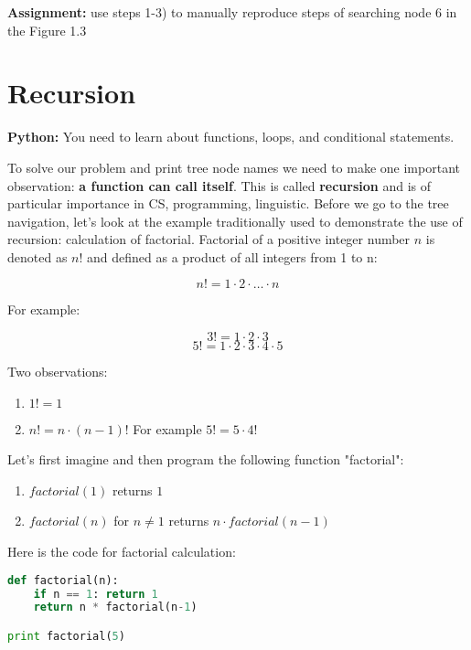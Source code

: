 \bigskip
\begin{tcolorbox}
\textbf{Assignment:} use steps 1-3) to manually reproduce 
steps of searching node 6 in
the Figure 1.3 
\end{tcolorbox}

\section{Recursion}

\begin{tcolorbox}
\textbf{Python:} 
You need to learn about functions, loops, and conditional statements.
\end{tcolorbox}

To solve our problem and print tree node names we need
to make one important observation: \textbf{a function can call itself}.
This is called \textbf{recursion} and is of particular importance in
CS, programming, linguistic. Before we go to the tree navigation,
let's look at the example traditionally used to demonstrate
the use of recursion: calculation of factorial. Factorial of a
positive integer number $n$
is denoted as $n!$ and defined as a product of all integers
from 1 to n:

$$n! = 1 \cdot 2 \cdot\dots\cdot n$$

For example:

$$3! = 1\cdot 2\cdot 3$$
$$5! = 1\cdot 2\cdot 3\cdot 4\cdot 5$$

Two observations:

\begin{leftborder}
\begin{enumerate}
\item $1! = 1$
\item $n! = n\cdot (n-1)!$ For example $5! = 5\cdot 4!$
\end{enumerate}
\end{leftborder}

Let's first imagine and then program the following function "factorial":

\begin{leftborder}
\begin{enumerate}
\item $factorial(1)$ returns $1$
\item $factorial(n)$ for $n\neq 1$ returns $n\cdot factorial(n-1)$
\end{enumerate}
\end{leftborder}

Here is the code for factorial calculation:
\begin{lstlisting}[style=codelst2,language=Python,caption={Python: factorial}]
def factorial(n):
    if n == 1: return 1
    return n * factorial(n-1)

print factorial(5)
\end{lstlisting}

